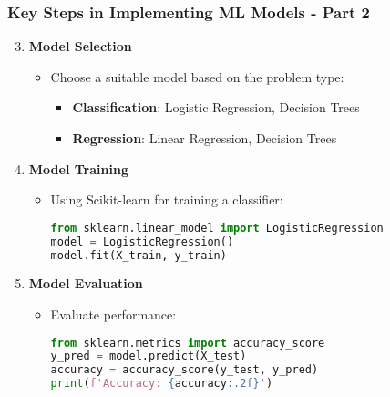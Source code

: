 \documentclass[aspectratio=169]{beamer}
\begin{document}
\begin{frame}[fragile]
    \frametitle{Key Steps in Implementing ML Models - Part 2}
    \begin{enumerate}
        \setcounter{enumi}{2} %
        \item \textbf{Model Selection}
        \begin{itemize}
            \item Choose a suitable model based on the problem type:
            \begin{itemize}
                \item \textbf{Classification}: Logistic Regression, Decision Trees
                \item \textbf{Regression}: Linear Regression, Decision Trees
            \end{itemize}
        \end{itemize}
        
        \item \textbf{Model Training}
        \begin{itemize}
            \item Using Scikit-learn for training a classifier:
            \begin{lstlisting}[language=Python]
from sklearn.linear_model import LogisticRegression
model = LogisticRegression()
model.fit(X_train, y_train)
            \end{lstlisting}
        \end{itemize}
        
        \item \textbf{Model Evaluation}
        \begin{itemize}
            \item Evaluate performance:
            \begin{lstlisting}[language=Python]
from sklearn.metrics import accuracy_score
y_pred = model.predict(X_test)
accuracy = accuracy_score(y_test, y_pred)
print(f'Accuracy: {accuracy:.2f}')
            \end{lstlisting}
        \end{itemize}
    \end{enumerate}
\end{frame}
\end{document}
